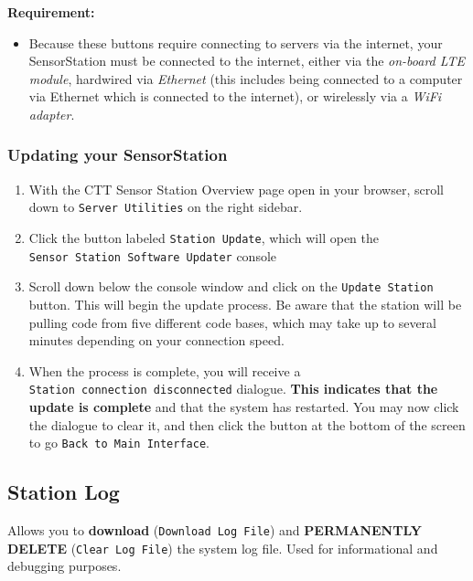 \documentclass[
]{article}
\providecommand{\tightlist}{%
  \setlength{\itemsep}{0pt}\setlength{\parskip}{0pt}}
\begin{document}
\textbf{Requirement:}

\begin{itemize}
\tightlist
\item
  Because these buttons require connecting to servers via the internet,
  your SensorStation must be connected to the internet, either via the
  \emph{on-board LTE module}, hardwired via \emph{Ethernet} (this
  includes being connected to a computer via Ethernet which is connected
  to the internet), or wirelessly via a \emph{WiFi adapter}.
\end{itemize}

\hypertarget{updating-your-sensorstation}{%
\subsubsection{Updating your
SensorStation}\label{updating-your-sensorstation}}

\begin{enumerate}
\def\labelenumi{\arabic{enumi}.}
\tightlist
\item
  With the CTT Sensor Station Overview page open in your browser, scroll
  down to \texttt{Server\ Utilities} on the right sidebar.
\item
  Click the button labeled \texttt{Station\ Update}, which will open the
  \texttt{Sensor\ Station\ Software\ Updater} console
\item
  Scroll down below the console window and click on the
  \texttt{Update\ Station} button. This will begin the update process.
  Be aware that the station will be pulling code from five different
  code bases, which may take up to several minutes depending on your
  connection speed.
\item
  When the process is complete, you will receive a
  \texttt{Station\ connection\ disconnected} dialogue. \textbf{This
  indicates that the update is complete} and that the system has
  restarted. You may now click the dialogue to clear it, and then click
  the button at the bottom of the screen to go
  \texttt{Back\ to\ Main\ Interface}.
\end{enumerate}

\hypertarget{station-log}{%
\subsection{Station Log}\label{station-log}}

Allows you to \textbf{download} (\texttt{Download\ Log\ File}) and
\textbf{PERMANENTLY DELETE} (\texttt{Clear\ Log\ File}) the system log
file. Used for informational and debugging purposes.
\end{document}
